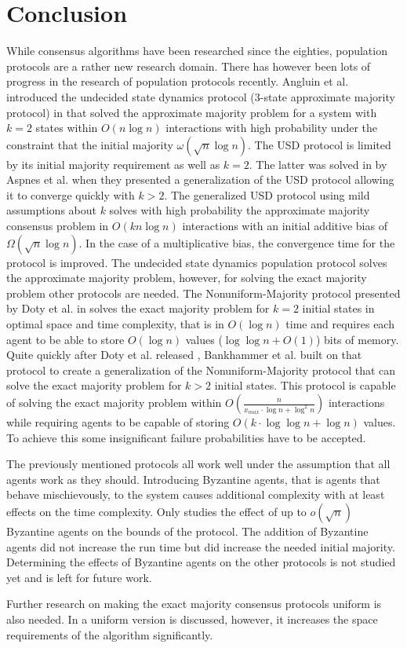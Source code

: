 \section{Conclusion} 
While consensus algorithms have been researched since the eighties, population protocols are a rather new research domain. There has however been lots of progress in the research of population protocols recently. Angluin et al. introduced the undecided state dynamics protocol (3-state approximate majority protocol) in \cite{angluinSimplePopulationProtocol2008} that solved the approximate majority problem for a system with $k = 2$ states within $O(n \log n)$ interactions with high probability under the constraint that the initial majority $\omega(\sqrt{n} \log n)$. The USD protocol is limited by its initial majority requirement as well as $k = 2$. The latter was solved in \cite{AspnesFastConverganceOfKOpinion2023} by Aspnes et al. when they presented a generalization of the USD protocol allowing it to converge quickly with $k > 2$. The generalized USD protocol using mild assumptions about $k$ solves with high probability the approximate majority consensus problem in $O(k n \log n)$ interactions with an initial additive bias of $\Omega(\sqrt{n} \log n)$. In the case of a multiplicative bias, the convergence time for the protocol is improved. The undecided state dynamics population protocol solves the approximate majority problem, however, for solving the exact majority problem other protocols are needed. The Nonuniform-Majority protocol presented by Doty et al. in \cite{dotyTimeSpaceOptimal2022} solves the exact majority problem for $k = 2$ initial states in optimal space and time complexity, that is in $O(\log n)$ time and requires each agent to be able to store $O(\log n)$ values ($\log \log n + O(1)$) bits of memory. Quite quickly after Doty et al. released \cite{dotyTimeSpaceOptimal2022}, Bankhammer et al. \cite{bankhamerPopulationProtocolsExact2022} built on that protocol to create a generalization of the Nonuniform-Majority protocol that can solve the exact majority problem for $k > 2$ initial states. This protocol is capable of solving the exact majority problem within $O(\frac{n}{x_{max} \cdot \log n + \log^2 n})$ interactions while requiring agents to be capable of storing $O(k \cdot \log \log n + \log n)$ values. To achieve this some insignificant failure probabilities have to be accepted.

 The previously mentioned protocols all work well under the assumption that all agents work as they should. Introducing Byzantine agents, that is agents that behave mischievously, to the system causes additional complexity with at least effects on the time complexity. Only \cite{angluinSimplePopulationProtocol2008} studies the effect of up to $o(\sqrt{n})$ Byzantine agents on the bounds of the protocol. The addition of Byzantine agents did not increase the run time but did increase the needed initial majority. Determining the effects of Byzantine agents on the other protocols is not studied yet and is left for future work. 

Further research on making the exact majority consensus protocols uniform is also needed. In \cite{dotyTimeSpaceOptimal2022} a uniform version is discussed, however, it increases the space requirements of the algorithm significantly. 